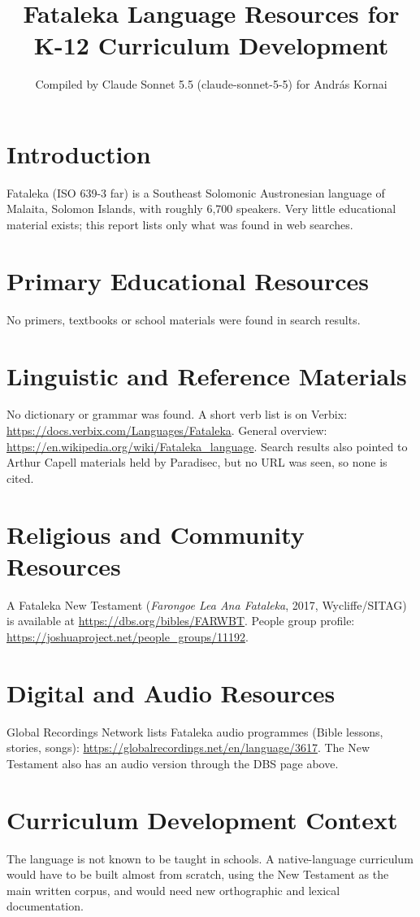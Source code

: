 \documentclass[12pt]{article}
\title{Fataleka Language Resources for K-12 Curriculum Development}
\author{Compiled by Claude Sonnet 5.5 (claude-sonnet-5-5) for Andr\'as Kornai}
\date{}
\begin{document}
\maketitle
\section{Introduction}
Fataleka (ISO 639-3 far) is a Southeast Solomonic Austronesian language of Malaita, Solomon Islands, with roughly 6,700 speakers. Very little educational material exists; this report lists only what was found in web searches.
\section{Primary Educational Resources}
No primers, textbooks or school materials were found in search results.
\section{Linguistic and Reference Materials}
No dictionary or grammar was found. A short verb list is on Verbix: \url{https://docs.verbix.com/Languages/Fataleka}. General overview: \url{https://en.wikipedia.org/wiki/Fataleka_language}. Search results also pointed to Arthur Capell materials held by Paradisec, but no URL was seen, so none is cited.
\section{Religious and Community Resources}
A Fataleka New Testament (\emph{Farongoe Lea Ana Fataleka}, 2017, Wycliffe/SITAG) is available at \url{https://dbs.org/bibles/FARWBT}. People group profile: \url{https://joshuaproject.net/people_groups/11192}.
\section{Digital and Audio Resources}
Global Recordings Network lists Fataleka audio programmes (Bible lessons, stories, songs): \url{https://globalrecordings.net/en/language/3617}. The New Testament also has an audio version through the DBS page above.
\section{Curriculum Development Context}
The language is not known to be taught in schools. A native-language curriculum would have to be built almost from scratch, using the New Testament as the main written corpus, and would need new orthographic and lexical documentation.
\end{document}
